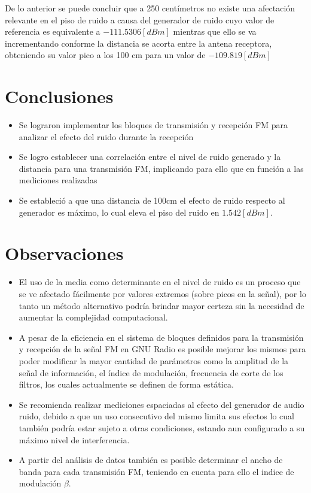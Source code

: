 \documentclass[conference]{IEEEtran}
\begin{document}
	De lo anterior se puede concluir que a 250 centímetros no existe una afectación relevante en el piso de ruido a causa del generador de ruido cuyo valor de referencia es equivalente a $-111.5306 [dBm]$ mientras que ello se va incrementando conforme la distancia se acorta entre la antena receptora, obteniendo su valor pico a los 100 cm para un valor de $-109.819 [dBm]$
	
	\section{Conclusiones}
	\begin{itemize}
		\item Se lograron implementar los bloques de transmisión y recepción FM para analizar el efecto del ruido durante la recepción
		\item Se logro establecer una correlación entre el nivel de ruido generado y la distancia para una transmisión FM, implicando para ello que en función a las mediciones realizadas
		\item Se estableció a que una distancia de 100cm el efecto de ruido respecto al generador es máximo, lo cual eleva el piso del ruido en $1.542 [dBm]$. 
	\end{itemize}
	
	\section{Observaciones}
	
	\begin{itemize}
		\item El uso de la media como determinante en el nivel de ruido es un proceso que se ve afectado fácilmente por valores extremos (sobre picos en la señal), por lo tanto un método alternativo podría brindar mayor certeza sin la necesidad de aumentar la complejidad computacional.
		\item A pesar de la eficiencia en el sistema de bloques definidos para la transmisión y recepción de la señal FM en GNU Radio es posible mejorar los mismos para poder modificar la mayor cantidad de parámetros como la amplitud de la señal de información, el índice de modulación, frecuencia de corte de los filtros, los cuales actualmente se definen de forma estática.
		\item Se recomienda realizar mediciones espaciadas al efecto del generador de audio ruido, debido a que un uso consecutivo del mismo limita sus efectos lo cual también podría estar sujeto a otras condiciones, estando aun configurado a su máximo nivel de interferencia.
		\item A partir del análisis de datos también es posible determinar el ancho de banda para cada transmisión FM, teniendo en cuenta para ello el indice de modulación $\beta$.
	\end{itemize}
	
\end{document}

